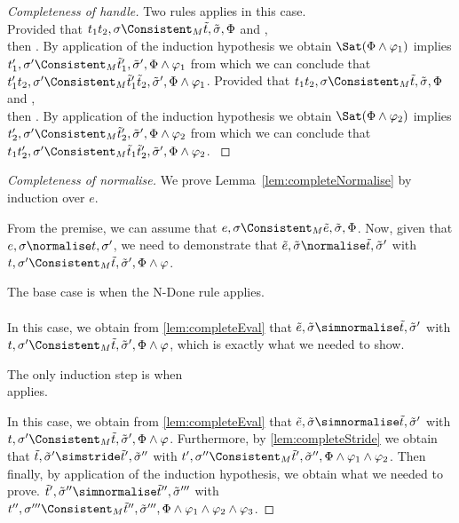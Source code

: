 \begin{proof}[Completeness of handle]
{{      }
      }
      {
      Two rules applies in this case.\\
      {
      Provided that $t_1\And t_2,\sigma\Consistent_{M}\tilde{t},\tilde{\sigma},\Phi$ and ,\\
      then .
      By application of the induction hypothesis we obtain $\Sat(\Phi\land\phi_1)$ implies $t_1',\sigma'\Consistent_{M}\tilde{t}_1',\tilde{\sigma}',\Phi\land\phi_1$
      from which we can conclude that $t_1'\And t_2,\sigma'\Consistent_{M}\tilde{t}_1'\And\tilde{t}_2,\tilde{\sigma}',\Phi\land\phi_1$.
      }
      {
      Provided that $t_1\And t_2,\sigma\Consistent_{M}\tilde{t},\tilde{\sigma},\Phi$ and ,\\
      then .
      By application of the induction hypothesis we obtain $\Sat(\Phi\land\phi_2)$ implies $t_2',\sigma'\Consistent_{M}\tilde{t}_2',\tilde{\sigma}',\Phi\land\phi_2$
      from which we can conclude that $t_1\And t_2',\sigma'\Consistent_{M}\tilde{t}_1\And\tilde{t}_2',\tilde{\sigma}',\Phi\land\phi_2$.
      }
      }
\end{proof}

\begin{proof}[Completeness of normalise]
  We prove Lemma~\ref{lem:completeNormalise} by induction over $e$.

  From the premise, we can assume that $e,\sigma\Consistent_M\tilde{e},\tilde{\sigma},\Phi$.
  Now, given that $e,\sigma\normalise t,\sigma'$,
  we need to demonstrate that $\tilde{e},\tilde{\sigma}\normalise \tilde{t},\tilde{\sigma}'$ with $t,\sigma'\Consistent_M\tilde{t},\tilde{\sigma}',\Phi\land\phi$.

  The base case is when the N-Done rule applies.\\
  \\

  In this case, we obtain from \cref{lem:completeEval} that
  $\tilde{e},\tilde{\sigma}\simnormalise \tilde{t},\tilde{\sigma}'$ with $t,\sigma'\Consistent_M\tilde{t},\tilde{\sigma}',\Phi\land\phi$,
  which is exactly what we needed to show.

  The only induction step is when\\
   applies.

  In this case, we obtain from \cref{lem:completeEval} that
  $\tilde{e},\tilde{\sigma}\simnormalise \tilde{t},\tilde{\sigma}'$ with $t,\sigma'\Consistent_M\tilde{t},\tilde{\sigma}',\Phi\land\phi$.
  Furthermore, by \cref{lem:completeStride} we obtain that
  $\tilde{t},\tilde{\sigma}'\simstride \tilde{t}',\tilde{\sigma}''$ with $t',\sigma''\Consistent_M\tilde{t}',\tilde{\sigma}'',\Phi\land\phi_1\land\phi_2$.
  Then finally, by application of the induction hypothesis, we obtain what we needed to prove.
  $\tilde{t}',\tilde{\sigma}''\simnormalise \tilde{t}'',\tilde{\sigma}'''$ with $t'',\sigma'''\Consistent_M\tilde{t}'',\tilde{\sigma}''',\Phi\land\phi_1\land\phi_2\land\phi_3$.
\end{proof}

